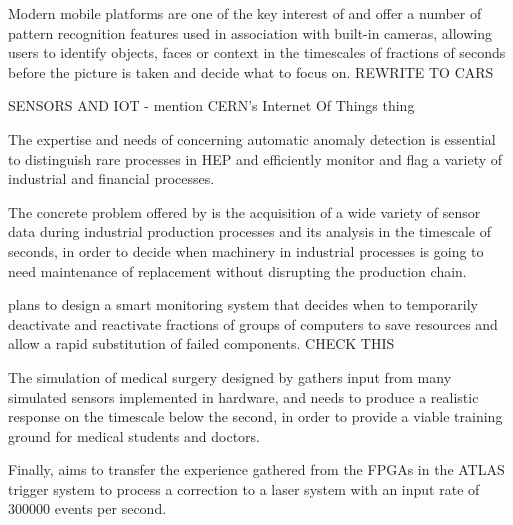 Modern mobile platforms are one of the key interest of \fleetmaticsentity and
offer a number of pattern recognition features used in association with built-in cameras, 
allowing users to identify objects, faces or context in the timescales of fractions of seconds before the picture is taken
and decide what to focus on. REWRITE TO CARS




SENSORS AND IOT - mention CERN's Internet Of Things thing
 
The expertise and needs of \ibmentity concerning automatic anomaly detection is essential to 
distinguish rare processes in HEP and efficiently monitor and flag a variety of industrial and financial processes. 

The concrete problem offered by \lightboxentity is the 
acquisition of a wide variety of sensor data during industrial production
processes and its analysis in the timescale of seconds, in order to decide when machinery
in industrial processes is going to need maintenance of replacement without 
disrupting the production chain. 

\wildtreeentity plans to design a smart monitoring system 
that decides when to temporarily deactivate and reactivate fractions of groups of 
computers to save resources and allow a rapid substitution of failed components. CHECK THIS


The simulation of medical surgery designed by \cathientity
gathers input from many simulated sensors implemented in hardware, and needs to produce
a realistic response on the timescale below the second, in order to provide a viable training
ground for medical students and doctors. 

Finally, \heidelberginstrumentsentity aims to
transfer the experience gathered from the FPGAs in the ATLAS trigger system to process a correction to a laser system with
an input rate of 300000 events per second. 






